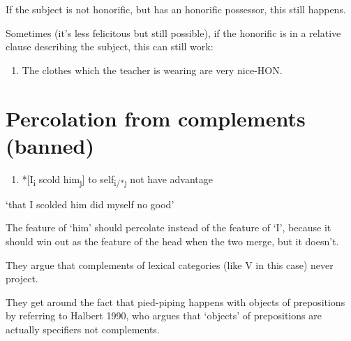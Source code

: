 If the subject is not honorific, but has an honorific possessor, this still happens.

Sometimes (it's less felicitous but still possible), if the honorific is in a relative clause describing the subject, this can still work:

\begin{enumerate}[start=7]
  \item The clothes which the teacher is wearing are very nice-HON.
\end{enumerate}

\section*{Percolation from complements (banned)}

\begin{enumerate}[start=8]
  \item *[I\textsubscript{i} scold him\textsubscript{j}] to self\textsubscript{i/*j} not have advantage
\end{enumerate}
`that I scolded him did myself no good'

The feature of `him' should percolate instead of the feature of `I', because it should win out as the feature of the head when the two merge, but it doesn't.

They argue that complements of lexical categories (like V in this case) never project.

They get around the fact that pied-piping happens with objects of prepositions by referring to Halbert 1990, who argues that `objects' of prepositions are actually specifiers not complements.
